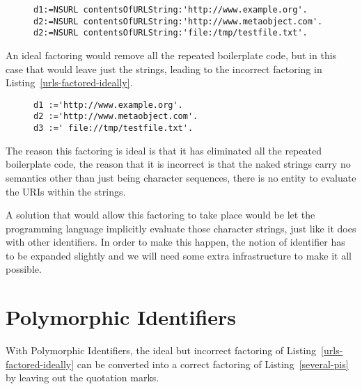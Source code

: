 \documentclass[preprint,authoryear]{acm_proc_article-sp}
\begin{document}
\begin{figure}[htbp]
\begin{lstlisting}[style=L,label=many-urls-factored1,caption=Partial factoring]
d1:=NSURL contentsOfURLString:'http://www.example.org'.
d2:=NSURL contentsOfURLString:'http://www.metaobject.com'.
d2:=NSURL contentsOfURLString:'file:/tmp/testfile.txt'.

\end{lstlisting}
\end{figure}

An ideal factoring would remove all the repeated boilerplate code, but in this case
that would leave just the strings, leading to the incorrect factoring in Listing~\ref{urls-factored-ideally}.


\begin{figure}[htbp]
\begin{lstlisting}[style=L,label=urls-factored-ideally,caption=Ideal but incorrect factoring]
d1 :='http://www.example.org'.
d2 :='http://www.metaobject.com'.
d3 :=' file://tmp/testfile.txt'.
\end{lstlisting}
\end{figure}

The reason this factoring is ideal is that it has eliminated all the repeated boilerplate code, the
reason that it is incorrect is that the naked strings carry no semantics other than just being
character sequences, there is no entity to evaluate the URIs within the strings.

A solution that would allow this factoring to take place would be let the programming
language implicitly evaluate those character strings, just like it does with other
identifiers.  In order to make this happen, the notion of identifier has to be expanded
slightly and we will need some extra infrastructure to make it all possible.



\section{Polymorphic Identifiers}
\label{polymorphic-identifiers}

With Polymorphic Identifiers, the ideal but incorrect factoring of Listing~\ref{urls-factored-ideally}
can be converted into a correct factoring of Listing~\ref{several-pis} by leaving out the quotation marks.
\end{document}
